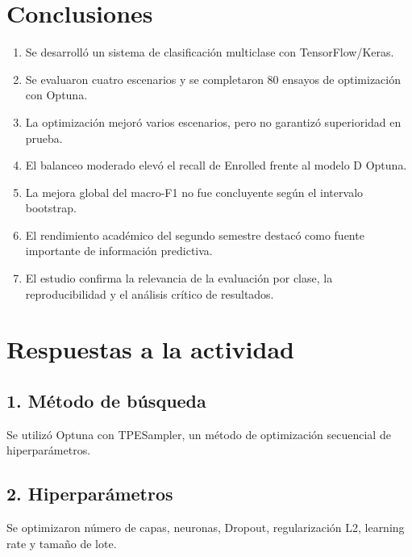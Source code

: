 \documentclass[11pt,a4paper]{article}
\begin{document}
\section{Conclusiones}

\begin{enumerate}
\item Se desarrolló un sistema de clasificación
multiclase con TensorFlow/Keras.

\item Se evaluaron cuatro escenarios y se
completaron 80 ensayos de optimización con Optuna.

\item La optimización mejoró varios escenarios,
pero no garantizó superioridad en prueba.

\item El balanceo moderado elevó el recall de
Enrolled frente al modelo D Optuna.

\item La mejora global del macro-F1 no fue
concluyente según el intervalo bootstrap.

\item El rendimiento académico del segundo semestre
destacó como fuente importante de información predictiva.

\item El estudio confirma la relevancia de
la evaluación por clase, la reproducibilidad
y el análisis crítico de resultados.
\end{enumerate}

\section{Respuestas a la actividad}

\subsection*{1. Método de búsqueda}

Se utilizó Optuna con TPESampler, un método de
optimización secuencial de hiperparámetros.

\subsection*{2. Hiperparámetros}

Se optimizaron número de capas, neuronas,
Dropout, regularización L2, learning rate
y tamaño de lote.
\end{document}
